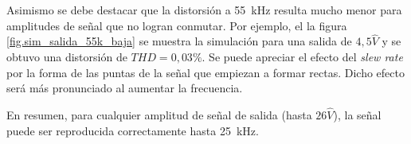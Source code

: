 

Asimismo se debe destacar que la distorsión a \SI{55}{\kilo\hertz} resulta mucho menor para amplitudes de señal que no logran conmutar. Por ejemplo, el la figura \ref{fig.sim_salida_55k_baja} se muestra la simulación para una salida de $4,5\hat{V}$ y se obtuvo una distorsión de $THD=0,03\%$. Se puede apreciar el efecto del \textit{slew rate} por la forma de las puntas de la señal que empiezan a formar rectas. Dicho efecto será más pronunciado al aumentar la frecuencia.



En resumen, para cualquier amplitud de señal de salida (hasta $26\hat{V}$), la señal puede ser reproducida correctamente hasta \SI{25}{\kilo\hertz}.

